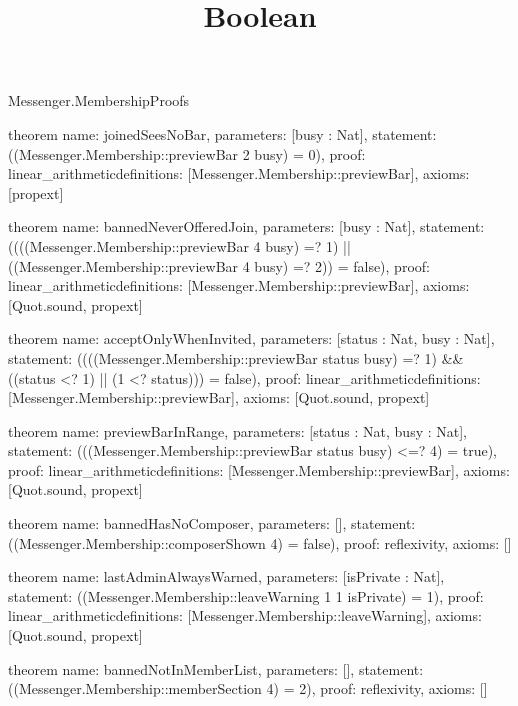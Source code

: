 \begin{lexlean}{Messenger.MembershipProofs}
\title{Boolean}
\begin{semanticmodule}
theorem{
  name: joinedSeesNoBar,
  parameters: [busy : Nat],
  statement: ((Messenger.Membership::previewBar 2 busy) = 0),
  proof: linear_arithmetic{definitions: [Messenger.Membership::previewBar]},
  axioms: [propext]
}

theorem{
  name: bannedNeverOfferedJoin,
  parameters: [busy : Nat],
  statement: ((((Messenger.Membership::previewBar 4 busy) =? 1) || ((Messenger.Membership::previewBar 4 busy) =? 2)) = false),
  proof: linear_arithmetic{definitions: [Messenger.Membership::previewBar]},
  axioms: [Quot.sound, propext]
}

theorem{
  name: acceptOnlyWhenInvited,
  parameters: [status : Nat, busy : Nat],
  statement: ((((Messenger.Membership::previewBar status busy) =? 1) && ((status <? 1) || (1 <? status))) = false),
  proof: linear_arithmetic{definitions: [Messenger.Membership::previewBar]},
  axioms: [Quot.sound, propext]
}

theorem{
  name: previewBarInRange,
  parameters: [status : Nat, busy : Nat],
  statement: (((Messenger.Membership::previewBar status busy) <=? 4) = true),
  proof: linear_arithmetic{definitions: [Messenger.Membership::previewBar]},
  axioms: [Quot.sound, propext]
}

theorem{
  name: bannedHasNoComposer,
  parameters: [],
  statement: ((Messenger.Membership::composerShown 4) = false),
  proof: reflexivity{},
  axioms: []
}

theorem{
  name: lastAdminAlwaysWarned,
  parameters: [isPrivate : Nat],
  statement: ((Messenger.Membership::leaveWarning 1 1 isPrivate) = 1),
  proof: linear_arithmetic{definitions: [Messenger.Membership::leaveWarning]},
  axioms: [Quot.sound, propext]
}

theorem{
  name: bannedNotInMemberList,
  parameters: [],
  statement: ((Messenger.Membership::memberSection 4) = 2),
  proof: reflexivity{},
  axioms: []
}


\end{semanticmodule}
\end{lexlean}
